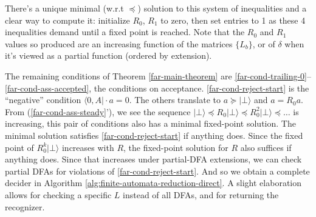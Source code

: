 There's a unique minimal (w.r.t $\preceq$) solution to this system of inequalities and a clear way to compute it: initialize $R_0$, $R_1$ to zero,
then set entries to 1 as these 4 inequalities demand until a fixed point is reached.
Note that the $R_0$ and $R_1$ values so produced are an increasing function of the matrices $\{L_b\}$, or of $\delta$ when it's viewed as a partial function (ordered by extension).

The remaining conditions of Theorem \ref{far-main-theorem} are \eqref{far-cond-trailing-0}--\eqref{far-cond-ass-accepted}, the conditions on acceptance.
\eqref{far-cond-reject-start} is the ``negative'' condition $\langle 0,A\vert \cdot a=0$.
The others translate to $a\succeq\vert\bot\rangle$ and $a=R_0 a$.
From (\ref{far-cond-ass-steady}'), we see the sequence $\vert\bot\rangle\preceq R_0\vert\bot\rangle\preceq R_0^2\vert\bot\rangle\preceq\dots$ is increasing, this pair of conditions also has a minimal fixed-point solution.
The minimal solution satisfies \eqref{far-cond-reject-start} if anything does.
Since the fixed point of $R_0^k \vert\bot\rangle$ increases with $R$, the fixed-point solution for $R$ also suffices if anything does.
Since that increases under partial-DFA extensions, we can check partial DFAs for violations of \eqref{far-cond-reject-start}.
And so we obtain a complete decider in Algorithm \ref{alg:finite-automata-reduction-direct}.
A slight elaboration allows for checking a specific $L$ instead of all DFAs, and for returning the recognizer.

